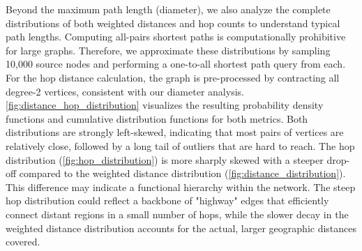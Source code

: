 Beyond the maximum path length (diameter), we also analyze the complete distributions of both weighted distances and hop counts to understand typical path lengths.
Computing all-pairs shortest paths is computationally prohibitive for large graphs.
Therefore, we approximate these distributions by sampling 10,000 source nodes and performing a one-to-all shortest path query from each.
For the hop distance calculation, the graph is pre-processed by contracting all degree-2 vertices, consistent with our diameter analysis.
\cref{fig:distance_hop_distribution} visualizes the resulting probability density functions and cumulative distribution functions for both metrics.
Both distributions are strongly left-skewed, indicating that most pairs of vertices are relatively close, followed by a long tail of outliers that are hard to reach.
The hop distribution (\cref{fig:hop_distribution}) is more sharply skewed with a steeper drop-off compared to the weighted distance distribution (\cref{fig:distance_distribution}).
This difference may indicate a functional hierarchy within the network.
The steep hop distribution could reflect a backbone of "highway" edges that efficiently connect distant regions in a small number of hops, while the slower decay in the weighted distance distribution accounts for the actual, larger geographic distances covered.

